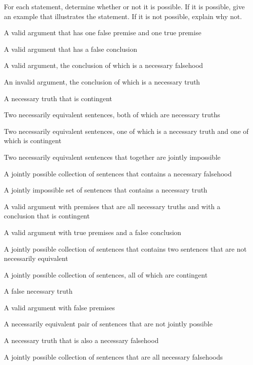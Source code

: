 \problempart
\label{pr.EnglishCombinations2}
For each statement, determine whether or not it is possible. If it is possible, give an example that illustrates the statement. If it is not possible, explain why not.
\begin{earg}
\item A valid argument that has one false premise and one true premise
\item A valid argument that has a false conclusion
\item A valid argument, the conclusion of which is a necessary falsehood
\item An invalid argument, the conclusion of which is a necessary truth
\item A necessary truth that is contingent
\item Two necessarily equivalent sentences, both of which are necessary truths
\item Two necessarily equivalent sentences, one of which is a necessary truth and one of which is contingent
\item Two necessarily equivalent sentences that together are jointly impossible
\item A jointly possible collection of sentences that contains a necessary falsehood
\item A jointly impossible set of sentences that contains a necessary truth

\item A valid argument with premises that are all necessary truths and with a conclusion that is contingent
\item A valid argument with true premises and a false conclusion
\item A jointly possible collection of sentences that contains two sentences that are not necessarily equivalent
\item A jointly possible collection of sentences, all of which are contingent
\item A false necessary truth
\item A valid argument with false premises
\item A necessarily equivalent pair of sentences that are not jointly possible
\item A necessary truth that is also a necessary falsehood
\item A jointly possible collection of sentences that are all necessary falsehoods
\end{earg}




